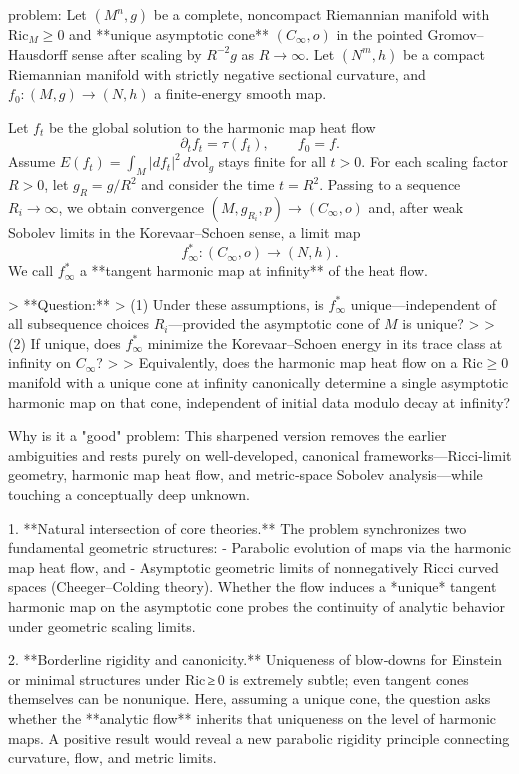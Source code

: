 problem:  
Let \((M^n,g)\) be a complete, noncompact Riemannian manifold with \(\mathrm{Ric}_M \ge 0\) and **unique asymptotic cone** \((C_\infty,o)\) in the pointed Gromov–Hausdorff sense after scaling by \(R^{-2}g\) as \(R\to\infty\).  
Let \((N^m,h)\) be a compact Riemannian manifold with strictly negative sectional curvature, and \(f_0:(M,g)\to(N,h)\) a finite‑energy smooth map.  

Let \(f_t\) be the global solution to the harmonic map heat flow
\[
\partial_t f_t = \tau(f_t), \qquad f_0 = f.
\]
Assume \(E(f_t)=\int_M|df_t|^2\,d\mathrm{vol}_g\) stays finite for all \(t>0\).  
For each scaling factor \(R>0\), let \(g_R=g/R^2\) and consider the time \(t=R^2.\)  Passing to a sequence \(R_i\to\infty\), we obtain convergence \((M,g_{R_i},p)\to (C_\infty,o)\) and, after weak Sobolev limits in the Korevaar–Schoen sense, a limit map
\[
f_\infty^\ast:(C_\infty,o)\longrightarrow (N,h).
\]
We call \(f_\infty^\ast\) a **tangent harmonic map at infinity** of the heat flow.

> **Question:**  
> (1) Under these assumptions, is \(f_\infty^\ast\) unique—independent of all subsequence choices \(R_i\)—provided the asymptotic cone of \(M\) is unique?  
>  
> (2) If unique, does \(f_\infty^\ast\) minimize the Korevaar–Schoen energy in its trace class at infinity on \(C_\infty\)?  
>  
> Equivalently, does the harmonic map heat flow on a \(\mathrm{Ric}\ge0\) manifold with a unique cone at infinity canonically determine a single asymptotic harmonic map on that cone, independent of initial data modulo decay at infinity?

Why is it a "good" problem:  
This sharpened version removes the earlier ambiguities and rests purely on well‑developed, canonical frameworks—Ricci‑limit geometry, harmonic map heat flow, and metric‑space Sobolev analysis—while touching a conceptually deep unknown.

1. **Natural intersection of core theories.**  
   The problem synchronizes two fundamental geometric structures:  
   - Parabolic evolution of maps via the harmonic map heat flow, and  
   - Asymptotic geometric limits of nonnegatively Ricci curved spaces (Cheeger–Colding theory).  
   Whether the flow induces a *unique* tangent harmonic map on the asymptotic cone probes the continuity of analytic behavior under geometric scaling limits.

2. **Borderline rigidity and canonicity.**  
   Uniqueness of blow‑downs for Einstein or minimal structures under Ric ≥ 0 is extremely subtle; even tangent cones themselves can be nonunique.  Here, assuming a unique cone, the question asks whether the **analytic flow** inherits that uniqueness on the level of harmonic maps. A positive result would reveal a new parabolic rigidity principle connecting curvature, flow, and metric limits.

